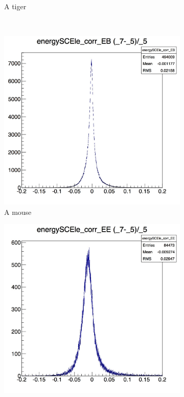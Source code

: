 \documentclass[10pt]{article}
\begin{document}
\begin{figure}[h!]
\begin{subfigure}[b]{0.4\textwidth}
                \caption{A tiger}
                \label{fig:tiger}
        \end{subfigure}
        ~ %
        \begin{subfigure}[b]{0.4\textwidth}
                \includegraphics[width=\textwidth]{Plots/corrEnergySC_EB}
                \caption{A mouse}
                \label{fig:mouse}
        \end{subfigure}
         \begin{subfigure}[b]{0.4\textwidth}
                \includegraphics[width=\textwidth]{Plots/corrEnergySC_EE}

\end{subfigure}
\end{figure}
\end{document}
